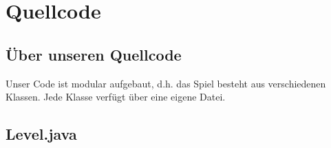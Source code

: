 \section{Quellcode}
\subsection{Über unseren Quellcode}
Unser Code ist modular aufgebaut, d.h. das Spiel besteht aus verschiedenen Klassen. Jede Klasse
verfügt über eine eigene Datei.
\subsection{Level.java}
